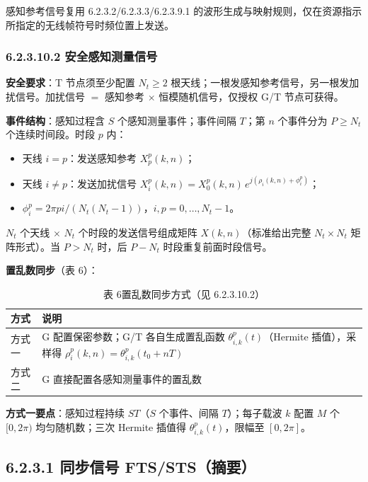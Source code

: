 \documentclass[11pt,a4paper]{ctexart}
\begin{document}
感知参考信号复用 6.2.3.2/6.2.3.3/6.2.3.9.1 的波形生成与映射规则，仅在资源指示所指定的无线帧符号时频位置上发送。

\subsubsection{6.2.3.10.2 安全感知测量信号}

\textbf{安全要求}：T 节点须至少配置 $N_t\geq 2$ 根天线；一根发感知参考信号，另一根发加扰信号。加扰信号 $=$ 感知参考 $\times$ 恒模随机信号，仅授权 G/T 节点可获得。

\textbf{事件结构}：感知过程含 $S$ 个感知测量事件；事件间隔 $T$；第 $n$ 个事件分为 $P\geq N_t$ 个连续时间段。时段 $p$ 内：
\begin{itemize}[nosep]
  \item 天线 $i{=}p$：发送感知参考 $X_p^p(k,n)$；
  \item 天线 $i{\neq}p$：发送加扰信号 $X_i^p(k,n)=X_0^p(k,n)\,e^{j(\rho_i(k,n)+\phi_i^p)}$；
  \item $\phi_i^p = 2\pi p i / (N_t(N_t{-}1))$，$i,p=0,\ldots,N_t{-}1$。
\end{itemize}

$N_t$ 个天线 $\times$ $N_t$ 个时段的发送信号组成矩阵 $X(k,n)$（标准给出完整 $N_t\times N_t$ 矩阵形式）。当 $P>N_t$ 时，后 $P{-}N_t$ 时段重复前面时段信号。

\textbf{置乱数同步}（表 6）：
\begin{table}[h]
\centering
\small
\caption{表 6\quad 置乱数同步方式（见 6.2.3.10.2）}
\begin{tabular}{ll}
\toprule
\textbf{方式} & \textbf{说明} \\
\midrule
方式一 & G 配置保密参数；G/T 各自生成置乱函数 $\theta_{i,k}^p(t)$（Hermite 插值），采样得 $\rho_i^p(k,n)=\theta_{i,k}^p(t_0+nT)$ \\
方式二 & G 直接配置各感知测量事件的置乱数 \\
\bottomrule
\end{tabular}
\end{table}

\textbf{方式一要点}：感知过程持续 $ST$（$S$ 个事件、间隔 $T$）；每子载波 $k$ 配置 $M$ 个 $[0,2\pi)$ 均匀随机数；三次 Hermite 插值得 $\theta_{i,k}^p(t)$，限幅至 $[0,2\pi]$。

\subsection{6.2.3.1 同步信号 FTS/STS（摘要）}
\end{document}
